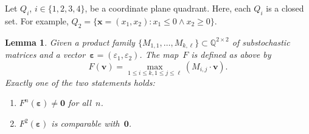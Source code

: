 \documentclass[preprint,12pt]{elsarticle}
\theoremstyle{plain}
\newtheorem{lemma}[theorem]{Lemma}
\theoremstyle{definition}
\theoremstyle{remark}
\theoremstyle{claimstyle}
\newcommand{\QQ}{\mathbb{Q}}
\newcommand{\eps}{\bm{\varepsilon}}
\begin{document}
Let $Q_i$, $i\in \{1,2,3,4\}$, be a coordinate plane quadrant.
Here, each $Q_i$ is a closed set.
For example, $Q_2 = \{\bm{x} = (x_1, x_2): x_1 \leq 0 \wedge x_2 \geq 0\}$.

\begin{lemma}\label{2d-comp-soon}
	Given a product family $\{M_{1,1}, \dots, M_{k,\ell}\} \subset \QQ^{2\times 2}$ of substochastic matrices
	and a vector~$\eps = (\varepsilon_1, \varepsilon_2)$. 
	The map~$F$ is defined as above by
	\[F(\bm{v}) = \max_{1\leq i \leq k, 1\leq j \leq \ell} \left(M_{i,j} \cdot\bm{v}\right).\]
	Exactly one of the two statements holds:
	\begin{enumerate}
		\item $F^n(\eps) \neq \bm{0}$ for all~$n$.
		\item $F^2(\eps)$ is comparable with~$\bm{0}$.
	\end{enumerate}
\end{lemma}
\end{document}
